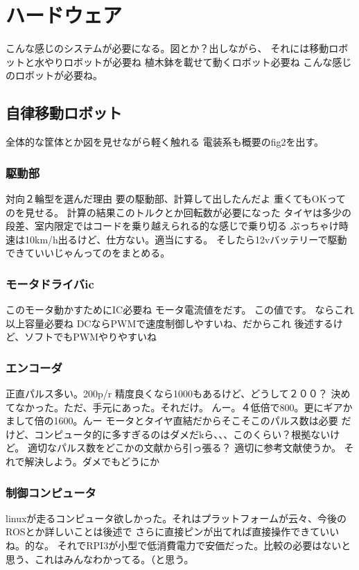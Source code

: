 \chapter{ハードウェア}
こんな感じのシステムが必要になる。図とか？出しながら、
それには移動ロボットと水やりロボットが必要ね
植木鉢を載せて動くロボット必要ね
こんな感じのロボットが必要ね。

\section{自律移動ロボット}
全体的な筐体とか図を見せながら軽く触れる
電装系も概要のfig2を出す。

\subsection{駆動部}
対向２輪型を選んだ理由
要の駆動部、計算して出したんだよ
重くてもOKってのを見せる。
計算の結果このトルクとか回転数が必要になった
タイヤは多少の段差、室内限定ではコードを乗り越えられる的な感じで乗り切る
ぶっちゃけ時速は10km/h出るけど、仕方ない。適当にする。
そしたら12vバッテリーで駆動できていいじゃんってのをまとめる。

\subsection{モータドライバic}
このモータ動かすためにIC必要ね
モータ電流値をだす。
この値です。
ならこれ以上容量必要ね
DCならPWMで速度制御しやすいね、だからこれ
後述するけど、ソフトでもPWMやりやすいね
\subsection{エンコーダ}
正直パルス多い。200p/r
精度良くなら1000もあるけど、どうして２００？
決めてなかった。ただ、手元にあった。それだけ。
んー。４低倍で800。更にギアかまして倍の1600。んー
モータとタイヤ直結だからそこそこのパルス数は必要
だけど、コンピュータ的に多すぎるのはダメだkら、、、このくらい？根拠ないけど。
適切なパルス数をどこかの文献から引っ張る？
適切に参考文献使うか。
それで解決しよう。ダメでもどうにか
\subsection{制御コンピュータ}
linuxが走るコンピュータ欲しかった。それはプラットフォームが云々、今後のROSとか詳しいことは後述で
さらに直接ピンが出てれば直接操作できていいね。的な。
それでRPI3が小型で低消費電力で安価だった。比較の必要はないと思う、これはみんなわかってる。（と思う。
